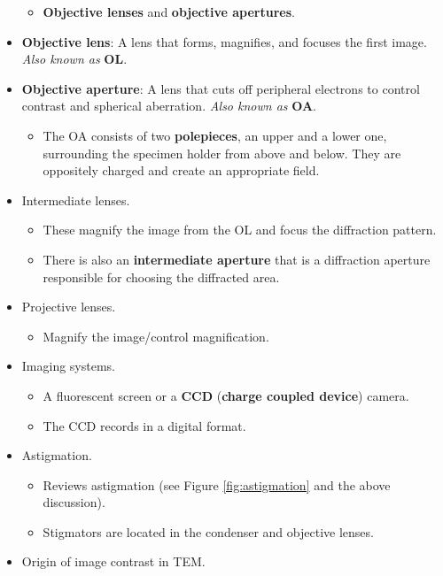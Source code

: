 \documentclass[../notes.tex]{subfiles}
\begin{document}
\begin{itemize}
\begin{itemize}
        \item \textbf{Objective lenses} and \textbf{objective apertures}.
    \end{itemize}
    \item \textbf{Objective lens}: A lens that forms, magnifies, and focuses the first image. \emph{Also known as} \textbf{OL}.
    \item \textbf{Objective aperture}: A lens that cuts off peripheral electrons to control contrast and spherical aberration. \emph{Also known as} \textbf{OA}.
    \begin{itemize}
        \item The OA consists of two \textbf{polepieces}, an upper and a lower one, surrounding the specimen holder from above and below. They are oppositely charged and create an appropriate field.
    \end{itemize}
    \item Intermediate lenses.
    \begin{itemize}
        \item These magnify the image from the OL and focus the diffraction pattern.
        \item There is also an \textbf{intermediate aperture} that is a diffraction aperture responsible for choosing the diffracted area.
    \end{itemize}
    \item Projective lenses.
    \begin{itemize}
        \item Magnify the image/control magnification.
    \end{itemize}
    \item Imaging systems.
    \begin{itemize}
        \item A fluorescent screen or a \textbf{CCD} (\textbf{charge coupled device}) camera.
        \item The CCD records in a digital format.
    \end{itemize}
    \item Astigmation.
    \begin{itemize}
        \item Reviews astigmation (see Figure \ref{fig:astigmation} and the above discussion).
        \item Stigmators are located in the condenser and objective lenses.
    \end{itemize}
    \item Origin of image contrast in TEM.
    \begin{itemize}

\end{itemize}
\end{itemize}
\end{document}
